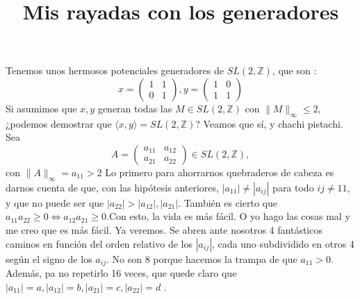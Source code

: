 \documentclass{article}
\title{Mis rayadas con los generadores}
\date{}
\newcommand\tab[1][0.6cm]{\hspace*{#1}}
\newcommand\nl{\newline\tab}
\begin{document}
	\maketitle
	Tenemos unos hermosos potenciales generadores de $ SL(2, \mathbb{Z}) $, que son : 
	$$
	x = 
	\begin{pmatrix}
	1 & 1 \\
	0 & 1 
	\end{pmatrix},	
	y = 
	\begin{pmatrix}
	1 & 0 \\
	1 & 1 
	\end{pmatrix}
	$$
	\nl
	Si asumimos que $x, y$ generan todas las $M \in SL(2, \mathbb{Z}) $ con  $ \| M \|_\infty \leq 2 $, ¿podemos demostrar que $\langle x, y \rangle =  SL(2, \mathbb{Z})$? \nl
	Veamos que sí, y chachi pistachi. 
	Sea $$
	A = 
	\begin{pmatrix}
	a_{11} & a_{12} \\
	a_{21} & a_{22} 
	\end{pmatrix} \in SL(2, \mathbb{Z}), $$ con  $ \| A \|_\infty = a_{11} > 2
	$ \nl 
	Lo primero para ahorrarnos quebraderos de cabeza es darnos cuenta de que, con las hipótesis anteriores,  $|a_{11}| \neq |a_{ij}|$ para todo $ij \neq 11$, y que no puede ser que $ |a_{22}| > |a_{12}|, |a_{21}|$. También es cierto que $a_{11}a_{22}\geq 0 \iff a_{12}a_{21}\geq 0$.\nl Con esto, la vida es más fácil. \nl
	O yo hago las cosas mal y me creo que es más fácil. Ya veremos. \nl
	Se abren ante nosotros 4 fantásticos caminos en función del orden relativo de los $|a_{ij}|$, cada uno subdividido en otros 4 según el signo de los $a_{ij}$. No son 8 porque hacemos la trampa de que $a_{11} > 0$. \nl
	Además, pa no repetirlo 16 veces, que quede claro que  $|a_{11}| = a, |a_{12}| = b, |a_{21}| = c, |a_{22}| = d $	.
\end{document}

